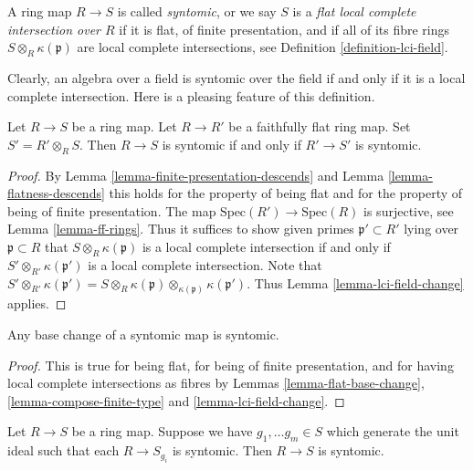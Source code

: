 \begin{definition}
\label{definition-lci}
A ring map $R \to S$ is called {\it syntomic}, or we say $S$ is a
{\it flat local complete intersection over $R$}
if it is flat, of finite presentation, and if all of its fibre rings
$S \otimes_R \kappa(\mathfrak p)$ are local complete intersections,
see Definition \ref{definition-lci-field}.
\end{definition}

\noindent
Clearly, an algebra over a field is syntomic over the field
if and only if it is a local complete intersection. Here is
a pleasing feature of this definition.

\begin{lemma}
\label{lemma-syntomic-descends}
Let $R \to S$ be a ring map.
Let $R \to R'$ be a faithfully flat ring map.
Set $S' = R'\otimes_R S$.
Then $R \to S$ is syntomic if and only if $R' \to S'$ is syntomic.
\end{lemma}

\begin{proof}
By Lemma \ref{lemma-finite-presentation-descends} and
Lemma \ref{lemma-flatness-descends} this holds for the property
of being flat and for the property of being of finite presentation.
The map $\text{Spec}(R') \to \text{Spec}(R)$ is surjective,
see Lemma \ref{lemma-ff-rings}. Thus it suffices to show
given primes $\mathfrak p' \subset R'$ lying over $\mathfrak p \subset R$
that $S \otimes_R \kappa(\mathfrak p)$ is a local complete
intersection if and only if $S' \otimes_{R'} \kappa(\mathfrak p')$
is a local complete intersection. Note that
$S' \otimes_{R'} \kappa(\mathfrak p') =
S \otimes_R \kappa(\mathfrak p)
\otimes_{\kappa(\mathfrak p)} \kappa(\mathfrak p')$.
Thus Lemma \ref{lemma-lci-field-change} applies.
\end{proof}

\begin{lemma}
\label{lemma-base-change-syntomic}
Any base change of a syntomic map is syntomic.
\end{lemma}

\begin{proof}
This is true for being flat, for being of finite presentation,
and for having local complete intersections as fibres by
Lemmas \ref{lemma-flat-base-change}, \ref{lemma-compose-finite-type} and
\ref{lemma-lci-field-change}.
\end{proof}

\begin{lemma}
\label{lemma-local-syntomic}
Let $R \to S$ be a ring map.
Suppose we have $g_1, \ldots g_m \in S$ which generate the
unit ideal such that each $R \to S_{g_i}$ is syntomic.
Then $R \to S$ is syntomic.
\end{lemma}

